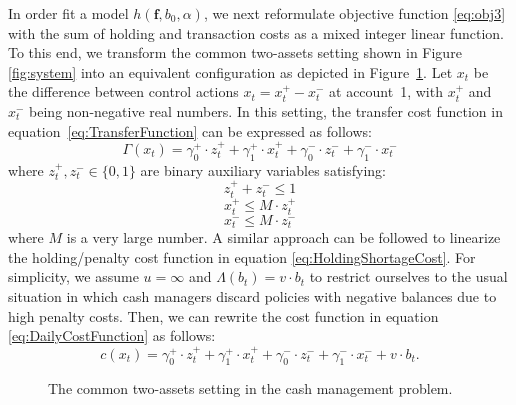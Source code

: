 In order fit a model $h(\boldsymbol{f},b_0,\alpha)$, we next reformulate objective function \eqref{eq:obj3} with the sum of holding and transaction costs as a mixed integer linear function. To this end, we transform the common two-assets setting shown in Figure \ref{fig:system} into an equivalent configuration as depicted in Figure~\ref{fig:introex}. Let $x_t$ be the difference between control actions $x_t = x_t^+ - x_t^-$ at account~1, with $x_t^+$ and $x_t^-$ being non-negative real numbers. In this setting, the transfer cost function in equation~\eqref{eq:TransferFunction} can be expressed as follows:
\begin{equation}
\Gamma(x_t) = \gamma_0^+ \cdot  z_t^+   + \gamma_1^+ \cdot  x_t^+ +\gamma_0^-  \cdot  z_t^-  + \gamma_1^- \cdot x_t^- 
\label{eq:lineartranscost}
\end{equation}
where $z_t^+, z_t^- \in \{0,1\}$ are binary auxiliary variables satisfying:
\begin{equation}
z_t^+ + z_t^- \leq 1
\end{equation}
\begin{equation}
x_t^+ \leq M \cdot z_t^+
\label{eq:zconstpos}
\end{equation}
\begin{equation}
x_t^- \leq M \cdot z_t^-
\label{eq:zconstneg}
\end{equation}
where $M$ is a very large number. A similar approach can be followed to linearize the holding/penalty cost function in equation \eqref{eq:HoldingShortageCost}. For simplicity, we assume $u=\infty$ and $\Lambda(b_t)=v \cdot b_t$ to restrict ourselves to the usual situation in which cash managers discard policies with negative balances due to high penalty costs. Then, we can rewrite the cost function in equation \eqref{eq:DailyCostFunction} as follows:
\begin{equation}
c(x_t) = \gamma_0^+ \cdot  z_t^+   + \gamma_1^+ \cdot  x_t^+ +\gamma_0^-  \cdot  z_t^-  + \gamma_1^- \cdot x_t^- + v \cdot b_t.
\end{equation}

\begin{figure}[htb]
\centering
{}
\caption{\label{fig:introex}The common two-assets setting in the cash management problem.}
\end{figure}


